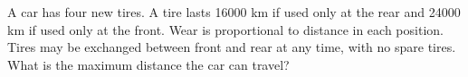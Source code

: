 A car has four new tires. A tire lasts 16000 km if used only at the rear and 24000 km if used only at the front. Wear is proportional to distance in each position. Tires may be exchanged between front and rear at any time, with no spare tires. What is the maximum distance the car can travel?
